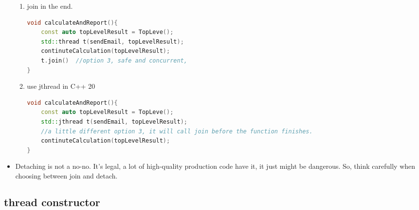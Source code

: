 \documentclass[a4paper,11pt,twoside]{book}
\begin{document}
\begin{itemize}
\begin{enumerate}
		\item join in the end.
\begin{lstlisting}[frame=single, language=c++]
void calculateAndReport(){
	const auto topLevelResult = TopLeve();
	std::thread t(sendEmail, topLevelResult);
	continuteCalculation(topLevelResult);
	t.join()  //option 3, safe and concurrent, 
}			
\end{lstlisting}			

		\item use jthread in C++ 20
\begin{lstlisting}[frame=single, language=c++]
void calculateAndReport(){
	const auto topLevelResult = TopLeve();
	std::jthread t(sendEmail, topLevelResult); 
	//a little different option 3, it will call join before the function finishes.
	continuteCalculation(topLevelResult);
}			
\end{lstlisting}		
	\end{enumerate} 

		\item Detaching is not a no-no. It’s legal, a lot of high-quality production code have it, it just might be dangerous. So, think carefully when choosing between join and detach.
\end{itemize}

	
\subsection{thread constructor}
\end{document}
